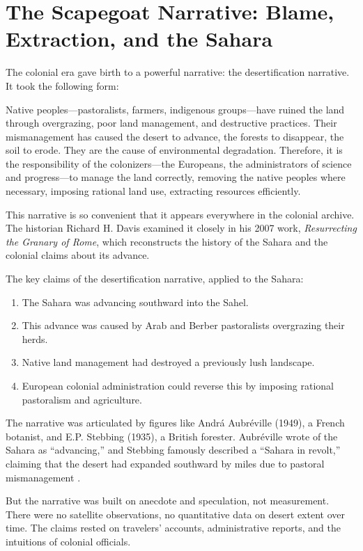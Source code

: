 \documentclass[12pt,a4paper]{article}
\begin{document}
\section{The Scapegoat Narrative: Blame, Extraction, and the Sahara}

The colonial era gave birth to a powerful narrative: the desertification narrative. It took the following form:

Native peoples—pastoralists, farmers, indigenous groups—have ruined the land through overgrazing, poor land management, and destructive practices. Their mismanagement has caused the desert to advance, the forests to disappear, the soil to erode. They are the cause of environmental degradation. Therefore, it is the responsibility of the colonizers—the Europeans, the administrators of science and progress—to manage the land correctly, removing the native peoples where necessary, imposing rational land use, extracting resources efficiently.

This narrative is so convenient that it appears everywhere in the colonial archive. The historian Richard H. Davis examined it closely in his 2007 work, \textit{Resurrecting the Granary of Rome}, which reconstructs the history of the Sahara and the colonial claims about its advance.

The key claims of the desertification narrative, applied to the Sahara:

\begin{enumerate}
\item The Sahara was advancing southward into the Sahel.
\item This advance was caused by Arab and Berber pastoralists overgrazing their herds.
\item Native land management had destroyed a previously lush landscape.
\item European colonial administration could reverse this by imposing rational pastoralism and agriculture.
\end{enumerate}

The narrative was articulated by figures like Andrá Aubréville (1949), a French botanist, and E.P. Stebbing (1935), a British forester. Aubréville wrote of the Sahara as ``advancing,'' and Stebbing famously described a ``Sahara in revolt,'' claiming that the desert had expanded southward by miles due to pastoral mismanagement \citep{Aubréville:1949}.

But the narrative was built on anecdote and speculation, not measurement. There were no satellite observations, no quantitative data on desert extent over time. The claims rested on travelers' accounts, administrative reports, and the intuitions of colonial officials.
\end{document}
